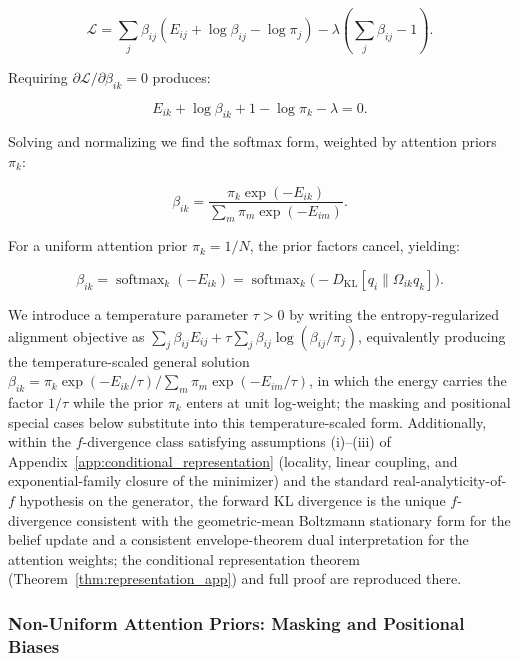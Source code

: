 \documentclass[11pt]{article}
\begin{document}
\begin{equation}
\mathcal{L} = \sum_j \beta_{ij}(E_{ij} + \log \beta_{ij} - \log \pi_j) - \lambda\left(\sum_j \beta_{ij} - 1\right).
\end{equation}

Requiring $\partial \mathcal{L} / \partial \beta_{ik} = 0$ produces:

\begin{equation}
E_{ik} + \log \beta_{ik} + 1 - \log \pi_k - \lambda = 0.
\end{equation}

Solving and normalizing we find the softmax form, weighted by attention priors $\pi_k$:

\begin{equation}
\beta_{ik} = \frac{\pi_k \exp(-E_{ik})}{\sum_m \pi_m \exp(-E_{im})}.
\label{eq:softmax_attention_general}
\end{equation}

For a uniform attention prior $\pi_k = 1/N$, the prior factors cancel, yielding:

\begin{equation}
\boxed{\beta_{ik} = \operatorname{softmax}_k(-E_{ik}) = \operatorname{softmax}_k\big(-D_{\mathrm{KL}}[q_i \| \Omega_{ik} q_k]\big).}
\label{eq:mixture_softmax}
\end{equation}

We introduce a temperature parameter $\tau>0$ by writing the entropy-regularized alignment objective as $\sum_j\beta_{ij}E_{ij}+\tau\sum_j\beta_{ij}\log(\beta_{ij}/\pi_j)$, equivalently producing the temperature-scaled general solution $\beta_{ik} = \pi_k\exp(-E_{ik}/\tau)/\sum_m \pi_m\exp(-E_{im}/\tau)$, in which the energy carries the factor $1/\tau$ while the prior $\pi_k$ enters at unit log-weight; the masking and positional special cases below substitute into this temperature-scaled form. Additionally, within the $f$-divergence class satisfying assumptions (i)--(iii) of Appendix~\ref{app:conditional_representation} (locality, linear coupling, and exponential-family closure of the minimizer) and the standard real-analyticity-of-$f$ hypothesis on the generator, the forward KL divergence is the unique $f$-divergence consistent with the geometric-mean Boltzmann stationary form for the belief update and a consistent envelope-theorem dual interpretation for the attention weights; the conditional representation theorem (Theorem~\ref{thm:representation_app}) and full proof are reproduced there.

\subsubsection{Non-Uniform Attention Priors: Masking and Positional Biases}
\label{sec:nonuniform_priors}
\end{document}
